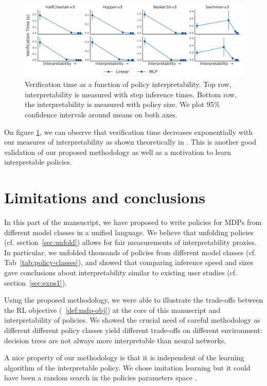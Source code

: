 \begin{figure}[ht]
    \centering
    \includegraphics[width=1\linewidth]{images/images_part3/verification_tradeoff.pdf}
    \caption{Verification time as a function of policy interpretability. Top row, interpretability is measured with step inference times. Bottom row, the interpretability is measured with policy size. We plot 95\% confidence intervals around means on both axes.}
    \label{fig:trade-off-verif}
\end{figure}

On figure \ref{fig:trade-off-verif}, we can observe that verification time decreases exponentially with our measures of interpretability as shown theoretically in \cite{lens-complexity}.
This is another good validation of our proposed methodology as well as a motivation to learn interpretable policies. 

\section{Limitations and conclusions}\label{sec:ccl-imit}
In this part of the mansucript, we have proposed to write policies for MDPs from different model classes in a unified language.
We believe that unfolding policies (cf. section~\ref{sec:unfold}) allows for fair measurements of interpretability proxies.
In particular, we unfolded thousands of policies from different model classes (cf. Tab~\ref{tab:policy-classes}), and showed that comparing inference speed and sizes gave conclusions about interpretability similar to existing user studies (cf. section~\ref{sec:exps1}).

Using the proposed methodology, we were able to illustrate the trade-offs between the RL objective (~\ref{def:mdp-obj}) at the core of this manuscript and interpretability of policies.
We showed the crucial need of careful methodology as different different policy classes yield different trade-offs on different environment: decision trees are not always more interpretable than neural networks. 

A nice property of our methodology is that it is independent of the learning algorithm of the interpretable policy.
We chose imitation learning but it could have been a random search in the policies parameters space \cite{empirical-evidence}.

